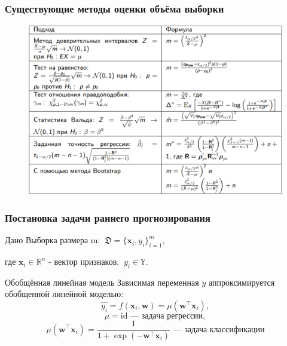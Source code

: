 \documentclass{beamer}
\begin{document}
\begin{frame}
\frametitle{Существующие методы оценки объёма выборки}

\begin{figure}
\includegraphics[scale=0.32]{../data/pics/methods.pdf}
\caption{}
\label{methods}
\end{figure}

\end{frame}

\begin{frame}
\frametitle{Постановка задачи раннего прогнозирования}
\begin{block}{Дано}
Выборка размера m: $~\mathfrak D = \{\textbf{x}_i, y_i\}_{i=1}^m,$

где $\textbf{x}_i \in \mathbb{R}^{n}$ - вектор признаков, $~y_i \in \mathbb{Y}$.
\end{block}

\begin{block}{Обобщённая линейная модель}
Зависимая переменная $y$ аппроксимируется обобщенной линейной моделью:
$$
\hat{y_i} = f(\mathbf{x}_i, \mathbf{w}) = \mu(\mathbf{w}^{\top}\mathbf{x}_i),
$$
$$
 \mu = \text{id} \text{ --- задача регрессии},
$$
$$
\mu(\mathbf{w}^{\top}\mathbf{x}_i) = \frac{1}{1 + \exp(-\mathbf{w}^{\top}\mathbf{x}_i)} \text{ --- задача классификации}
$$
\end{block}



\end{frame}
\end{document}
